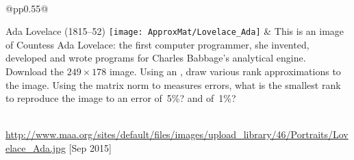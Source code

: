 \begin{exercise}\ \\ \label{ex:lovelace} 
\begin{tabular}{@{}p{\marginparwidth}p{0.55\linewidth}@{}}
\raggedright
Ada Lovelace (1815--52)
\texttt{[image: ApproxMat/Lovelace\_Ada]} 
&
This is an image of Countess Ada Lovelace: the first computer programmer, she invented, developed and wrote programs for Charles Babbage's analytical engine.
Download the \(249\times178\) image.
Using an \svd, draw various rank approximations to the image.
Using the matrix norm to measures errors, what is the smallest rank to reproduce the image to an error of~5\%? and of~1\%?
\end{tabular}\\
\url{http://www.maa.org/sites/default/files/images/upload_library/46/Portraits/Lovelace_Ada.jpg} 
[Sep 2015]
\end{exercise}








